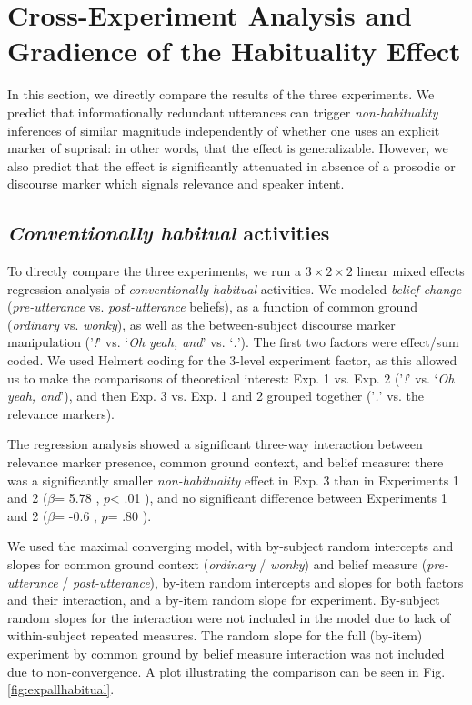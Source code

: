 \documentclass{sp}\usepackage[]{graphicx}\usepackage[]{color}
\begin{document}
\section{Cross-Experiment Analysis and Gradience of the Habituality Effect}\label{cross-experiment-analysis-and-gradience-of-the-non-habituality-effect}



In this section, we directly compare the results of the three experiments.  We predict that informationally redundant utterances can trigger \textit{non-habituality} inferences of similar magnitude independently of whether one uses an explicit marker of suprisal: in other words, that the effect is generalizable.  However, we also predict that the effect is significantly attenuated in absence of a prosodic or discourse marker which signals relevance and speaker intent.

\subsection{\textit{Conventionally habitual} activities}

To directly compare the three experiments, we run a $3\times 2\times 2$ linear mixed effects regression analysis of \textit{conventionally habitual} activities.  We modeled \textit{belief change} (\textit{pre-utterance} vs. \textit{post-utterance} beliefs), as a function of common ground (\textit{ordinary} vs. \textit{wonky}), as well as the between-subject discourse marker manipulation ('\textit{!}' vs. `\textit{Oh yeah, and}' vs. `\textit{.}').  The first two factors were effect/sum coded.  We used Helmert coding for the 3-level experiment factor, as this allowed us to make the comparisons of theoretical interest: Exp. 1 vs. Exp. 2 ('\textit{!}' vs. `\textit{Oh yeah, and}'), and then Exp. 3 vs. Exp. 1 and 2 grouped together ('\textit{.}' vs. the relevance markers).

The regression analysis showed a significant three-way interaction between relevance marker presence, common ground context, and belief measure: there was a significantly smaller \textit{non-habituality} effect in Exp. 3 than in Experiments 1 and 2 ($\beta$=%
5.78
, $p$<%
.01
), and no significant difference between Experiments 1 and 2 ($\beta$=%
-0.6
, $p$=%
.80
).


We used the maximal converging model, with by-subject random intercepts and slopes for common ground context (\textit{ordinary} / \textit{wonky}) and belief measure (\textit{pre-utterance} / \textit{post-utterance}), by-item random intercepts and slopes for both factors and their interaction, and a by-item random slope for experiment. By-subject random slopes for the interaction were not included in the model due to lack of within-subject repeated measures. The random slope for the full (by-item) experiment by common ground by belief measure interaction was not included due to non-convergence. A plot illustrating the comparison can be seen in Fig. \ref{fig:expallhabitual}.
\end{document}
